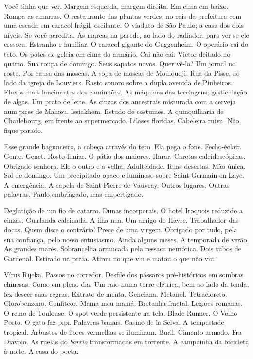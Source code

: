 Você tinha que ver. Margem esquerda, margem direita. Em cima em baixo.
Rompa as amarras. O restaurante das plantas verdes, no cais da
prefeitura com uma escada em caracol frágil, oscilante. O viaduto de São
Paulo; a casa dos dois níveis. Se você acredita. As marcas na parede, ao
lado do radiador, para ver se ele cresceu. Estranho e familiar. O
caracol gigante do Guggenheim. O operário cai do teto. Os potes de
geleia em cima do armário. Cai não cai. Victor deitado no quarto. Sua
roupa de domingo. Seus sapatos novos. Quer vê-lo? Um jornal no rosto.
Por causa das moscas. A sopa de moscas de Mouloudji. Rua da Pisse, ao
lado da igreja de Louviers. Rasto sonoro sobre a dupla avenida de
Pinheiros. Fluxos mais lancinantes dos caminhões. As máquinas das
tecelagens; gesticulação de algas. Um prato de leite. As cinzas dos
ancestrais misturada com a cerveja num pires de Mahieu. Issiakhem.
Estudo de costumes. A quinquilharia de Charlebourg, em frente ao
supermercado. Lilases floridas. Cabeleira ruiva. Não fique parado.

Esse grande bagunceiro, a cabeça através do teto. Ela pega o fone.
Fecho-éclair. Gente. Genet. Rosto-limiar. O pátio dos maiores. Harar.
Caretas caleidoscópicas. Obrigado senhora. Ele o outro e a velha.
Adulteidade. Ruas desertas. Mão única. Sol de domingo. Um precipitado
opaco e luminoso sobre Saint-Germain-en-Laye. A emergência. A capela de
Saint-Pierre-de-Vauvray. Outros lugares. Outras palavras. Paulo
embriagado, mas empertigado.

Deglutição de um fio de catarro. Dunas incorporais. O hotel Iroquois
reduzido a cinzas. Guirlanda calcinada. A ilha nua. Um amigo do Havre.
Trabalhador das docas. Quem disse o contrário! Prece de uma virgem.
Obrigado por tudo, pela sua confiança, pelo nosso entusiasmo. Ainda
alguns meses. A temporada de verão. As grandes marés. Sobrancelha
arrancada pela ressaca neurótica. Dois tubos de Gardenal. Estirado na
praia. Atirou no que viu e matou o que não viu.

Vírus Rijeka. Passos no corredor. Desfile dos pássaros pré-históricos em
sombras chinesas. Como em pleno dia. Um raio numa torre elétrica, bem ao
lado da tenda, fez descer suas regras. Extrato de menta. Genciana.
Metanol. Tetracloreto. Clorobenzeno. Confiteor. Mamã meu mamá. Bretanha
fractal. Legiões romanas. O remo de Toulouse. O spot verde persistente
na tela. Blade Runner. O Velho Porto. O gato faz pipi. Palavras banais.
Casino de la Selva. A tempestade tropical. Arbustos de flores vermelhas
se iluminam. Buril. Cimento armado. Fra Diavolo. As ruelas do
\emph{barrio} transformadas em torrente. A campainha da bicicleta à
noite. A casa do poeta.

